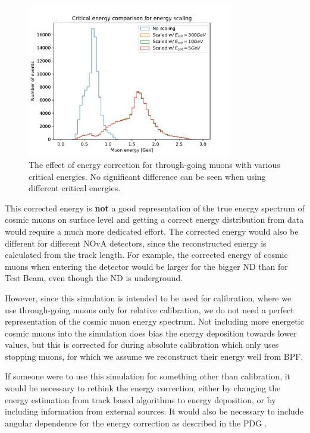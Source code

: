 \begin{figure}[hbtp]
\centering
\includegraphics[width=0.8\textwidth]{Plots/TBCalibration/DBSim_ECritComparison.pdf}
\caption[Energy correction for through-going muons for the data-based simulation]{The effect of energy correction for through-going muons with various critical energies. No significant difference can be seen when using different critical energies.}
\label{fig:DataBasedSimEnergyScaling}
\end{figure}

This corrected energy is \textbf{not} a good representation of the true energy spectrum of cosmic muons on surface level and getting a correct energy distribution from data would require a much more dedicated effort. The corrected energy would also be different for different \gls{NOvA} detectors, since the reconstructed energy is calculated from the track length. For example, the corrected energy of cosmic muons when entering the detector would be larger for the bigger \gls{ND} than for Test Beam, even though the \gls{ND} is underground. 

However, since this simulation is intended to be used for calibration, where we use through-going muons only for relative calibration, we do not need a perfect representation of the cosmic muon energy spectrum. Not including more energetic cosmic muons into the simulation does bias the energy deposition towards lower values, but this is corrected for during absolute calibration which only uses stopping muons, for which we assume we reconstruct their energy well from \gls{BPF}.

If someone were to use this simulation for something other than calibration, it would be necessary to rethink the energy correction, either by changing the energy estimation from track based algorithms to energy deposition, or by including information from external sources. It would also be necessary to include angular dependence for the energy correction as described in the PDG \cite{rpp2022-rev-cosmic-rays.pdf}.

